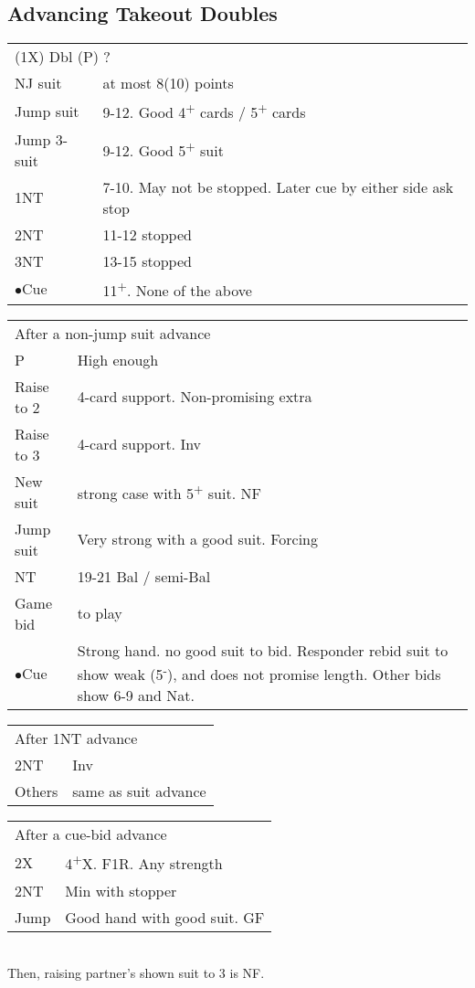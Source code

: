 \documentclass{article}
\newcommand{\nt}{\relsize{-1}NT\relsize{1}}
\newcommand{\up}{\textsuperscript{+}}
\newcommand{\down}{\textsuperscript{-}}
\newcommand{\al}{$\bullet$}
\begin{document}
\subsection{Advancing Takeout Doubles}
\begin{tabular}{|l|p{6.5cm}}
	\multicolumn{2}{l}{(1X) Dbl (P) ?} \\
  NJ suit & at most 8(10) points \\
	Jump suit & 9-12. Good 4\up{} cards / 5\up{} cards \\
	Jump 3-suit & 9-12. Good 5\up{} suit \\
	1\nt{} & 7-10. May not be stopped. Later cue by either side ask stop \\
	2\nt{} & 11-12 stopped \\
	3\nt{} & 13-15 stopped \\
	\al{}Cue & 11\up{}. None of the above \\
\end{tabular}

\medskip

\begin{tabular}{|l|p{6.5cm}}
	\multicolumn{2}{l}{After a non-jump suit advance} \\
  P & High enough \\
	Raise to 2 & 4-card support. Non-promising extra \\
	Raise to 3 & 4-card support. Inv \\
	New suit & strong case with 5\up{} suit. NF \\
	Jump suit & Very strong with a good suit. Forcing \\
	\nt{} & 19-21 Bal / semi-Bal \\
	Game bid & to play \\
	\al{}Cue & Strong hand. no good suit to bid. Responder rebid suit to show weak (5\down{}), and does not promise length. Other bids show 6-9 and Nat. \\
\end{tabular}

\medskip

\begin{tabular}{|l|p{6.5cm}}
	\multicolumn{2}{l}{After 1\nt{} advance} \\
  2\nt{} & Inv \\
	Others & same as suit advance \\
\end{tabular}

\medskip

\begin{tabular}{|l|p{6.5cm}}
	\multicolumn{2}{l}{After a cue-bid advance} \\
  	2X & 4\up{}X. F1R. Any strength \\
 	2\nt{} & Min with stopper \\
	Jump & Good hand with good suit. GF \\
\end{tabular}\\
Then, raising partner's shown suit to 3 is NF.
\end{document}
